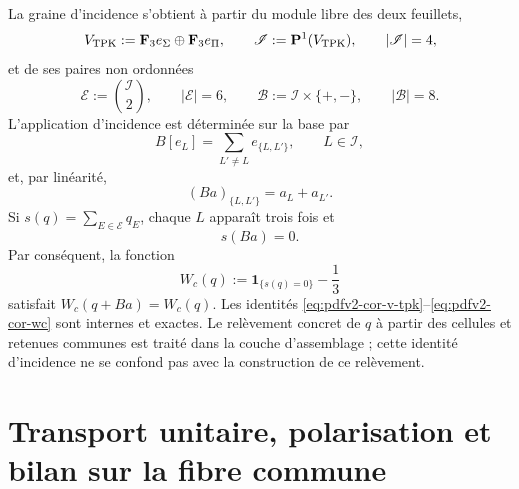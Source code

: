 La graine d'incidence s'obtient à partir du module libre des deux feuillets,
\begin{equation}
\label{eq:pdfv2-cor-v-tpk}
 V_{\rm TPK}:=\mathbf F_3e_\Sigma\oplus\mathbf F_3e_\Pi,
 \qquad
 \mathscr I:=\mathbf P^1(V_{\rm TPK}),
 \qquad |\mathscr I|=4,
\end{equation}
et de ses paires non ordonnées
\begin{equation}
\label{eq:pdfv2-cor-incidencias}
 \mathscr E:=\binom{\mathscr I}{2},
 \qquad |\mathscr E|=6,
 \qquad
 \mathscr B:=\mathscr I\times\{+,-\},
 \qquad |\mathscr B|=8.
\end{equation}
L'application d'incidence est déterminée sur la base par
\begin{equation}
\label{eq:pdfv2-cor-b-incidencia-generadores}
 B[e_L]=\sum_{L'\neq L}e_{\{L,L'\}},
 \qquad L\in\mathscr I,
\end{equation}
et, par linéarité,
\begin{equation}
\label{eq:pdfv2-cor-b-incidencia-coordenadas}
 (Ba)_{\{L,L'\}}=a_L+a_{L'}.
\end{equation}
Si \(s(q)=\sum_{E\in\mathscr E}q_E\), chaque \(L\) apparaît trois fois et
\begin{equation}
\label{eq:pdfv2-cor-sb-cero}
 s(Ba)=0.
\end{equation}
Par conséquent, la fonction
\begin{equation}
\label{eq:pdfv2-cor-wc}
 W_c(q):=\mathbf1_{\{s(q)=0\}}-\frac13
\end{equation}
satisfait \(W_c(q+Ba)=W_c(q)\). Les identités \eqref{eq:pdfv2-cor-v-tpk}--\eqref{eq:pdfv2-cor-wc} sont internes et exactes. Le relèvement concret de \(q\) à partir des cellules et retenues communes est traité dans la couche d'assemblage ; cette identité d'incidence ne se confond pas avec la construction de ce relèvement.

\section{Transport unitaire, polarisation et bilan sur la fibre commune}


